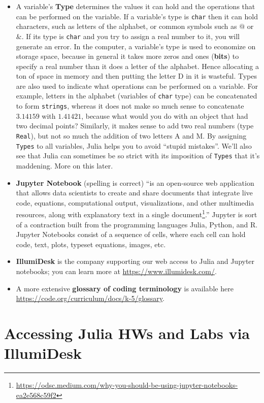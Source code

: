 \begin{itemize}
    \item A variable's \textbf{Type} determines the values it can hold and the operations that can be performed on the variable. If a variable's type is \texttt{char} then it can hold characters, such as letters of the alphabet, or common symbols such as $@$ or $\&$. If its type is \texttt{char} and you try to assign a real number to it, you will generate an error. In the computer, a variable's type is used to economize on storage space, because in general it takes more zeros and ones (\textbf{bits}) to specify a real number than it does a letter of the alphabet. Hence allocating a ton of space in memory and then putting the letter D in it is wasteful. Types are also used to indicate what operations can be performed on a variable. For example, letters in the alphabet (variables of \texttt{char} type) can be concatenated to form \texttt{strings}, whereas it does not make so much sense to concatenate $3.14159$ with $1.41421$, because what would you do with an object that had two decimal points? Similarly, it makes sense to add two real numbers (type \texttt{Real}), but not so much the addition of two letters A and M. By assigning \texttt{Types} to all variables, Julia helps you to avoid ``stupid mistakes''. We'll also see that Julia can sometimes be so strict with its imposition of \texttt{Types} that it's maddening. More on this later.
    \item \textbf{Jupyter Notebook} (spelling is correct) ``is an open-source web application that allows data scientists to create and share documents that integrate live code, equations, computational output, visualizations, and other multimedia resources, along with explanatory text in a single document\footnote{\url{https://odsc.medium.com/why-you-should-be-using-jupyter-notebooks-ea2e568c59f2}}.'' Jupyter is sort of a contraction built from the programming languages Julia, Python, and R.  Jupyter Notebooks consist of a sequence of cells, where each cell can hold code, text, plots, typeset equations, images, etc.
    \item \textbf{IllumiDesk} is the company supporting our web access to Julia and Jupyter notebooks; you can learn more at \url{https://www.illumidesk.com/}. 
     \item A more extensive \textbf{glossary of coding terminology} is available here \url{https://code.org/curriculum/docs/k-5/glossary}. 
\end{itemize}

\section{Accessing Julia HWs and Labs via IllumiDesk}
\label{sec:IllumiDesk}

